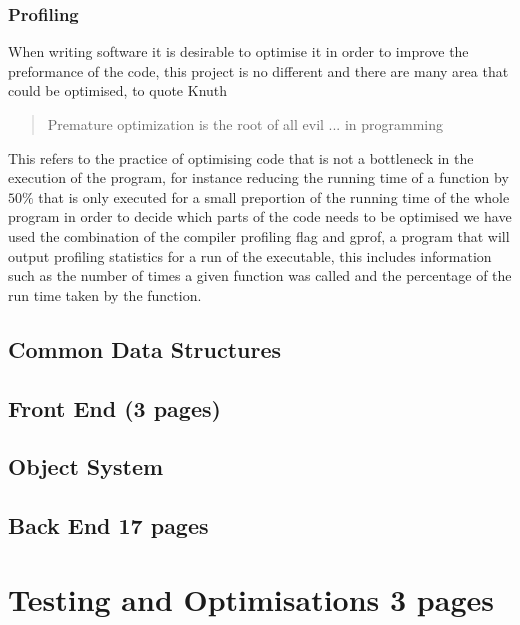 \subsection{Profiling}
When writing software it is desirable to optimise it in order to improve the preformance of the code, this project
is no different and there are many area that could be optimised, to quote Knuth

\begin{quotation}
{Premature optimization is the root of all evil ... in programming \cite{Knuth74a}}
\end{quotation}

This refers to the practice of optimising code that is not a bottleneck in the execution of the program, for instance
reducing the running time of a function by $50\%$ that is only executed for a small preportion of the running time of
the whole program in order to decide which parts of the code needs to be optimised we have used the combination of
the compiler profiling flag and gprof, a program that will output profiling statistics for a run of the executable,
this includes information such as the number of times a given function was called and the percentage of the run time
taken by the function.

\newpage
\section{Common Data Structures}

\newpage
\section{Front End (3 pages)}

\newpage
\section{Object System}

\newpage
\section{Back End 17 pages}

\newpage
\chapter{Testing and Optimisations 3 pages}

